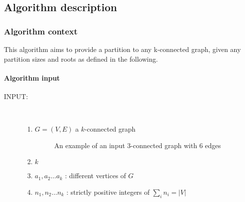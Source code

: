 \subsection{Algorithm description}
 \subsubsection{Algorithm context}
This algorithm aims to provide a partition to any k-connected graph, given any partition sizes and roots as defined in the following.

\paragraph{Algorithm input}
 \begin{description}
  \item [INPUT:] \hfill \\
    \begin{enumerate}
    \item $G = (V, E)$ a $k$-connected graph 
      \begin{figure}[H]
	\begin{center}
	  
	\end{center}
	\caption{An example of an input 3-connected graph with 6 edges}
      \end{figure}
    \item $k$
    \item $a_1, a_2 \ldots a_k$ : different vertices of $G$
    \item $n_1, n_2 \ldots n_k$ : strictly positive integers of $\sum_i n_i =  |V|$
    \end{enumerate}
    
  \end{description}

